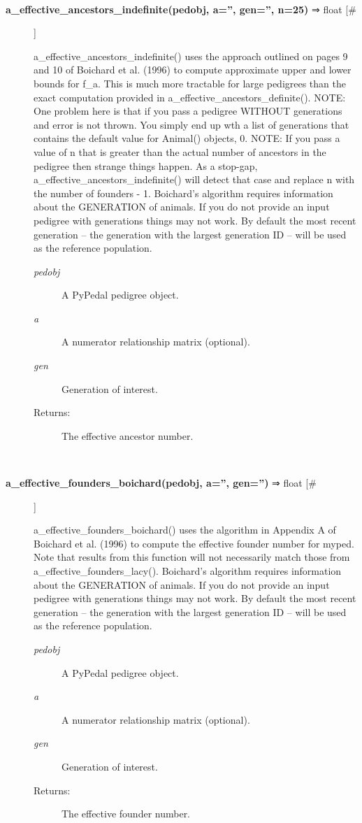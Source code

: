 \begin{description}
\begin{description}
\end{description}
\\ 

\item[\textbf{a\_effective\_ancestors\_indefinite(pedobj, a='', gen='', n=25)}
 ⇒ float [\#]]

 a\_effective\_ancestors\_indefinite() uses the approach outlined on pages 9 and 10 of Boichard et al. (1996) to compute approximate upper and lower bounds for f\_a. This is much more tractable for large pedigrees than the exact computation provided in a\_effective\_ancestors\_definite(). NOTE: One problem here is that if you pass a pedigree WITHOUT generations and error is not thrown. You simply end up wth a list of generations that contains the default value for Animal() objects, 0. NOTE: If you pass a value of n that is greater than the actual number of ancestors in the pedigree then strange things happen. As a stop-gap, a\_effective\_ancestors\_indefinite() will detect that case and replace n with the number of founders - 1. Boichard's algorithm requires information about the GENERATION of animals. If you do not provide an input pedigree with generations things may not work. By default the most recent generation -- the generation with the largest generation ID -- will be used as the reference population.
\begin{description}
\item[\emph{pedobj}
] A PyPedal pedigree object.
\item[\emph{a}
] A numerator relationship matrix (optional).
\item[\emph{gen}
] Generation of interest.
\item[Returns:] The effective ancestor number.

\end{description}
\\ 

\item[\textbf{a\_effective\_founders\_boichard(pedobj, a='', gen='')}
 ⇒ float [\#]]

 a\_effective\_founders\_boichard() uses the algorithm in Appendix A of Boichard et al. (1996) to compute the effective founder number for myped. Note that results from this function will not necessarily match those from a\_effective\_founders\_lacy(). Boichard's algorithm requires information about the GENERATION of animals. If you do not provide an input pedigree with generations things may not work. By default the most recent generation -- the generation with the largest generation ID -- will be used as the reference population.
\begin{description}
\item[\emph{pedobj}
] A PyPedal pedigree object.
\item[\emph{a}
] A numerator relationship matrix (optional).
\item[\emph{gen}
] Generation of interest.
\item[Returns:] The effective founder number.


\end{description}
\end{description}
